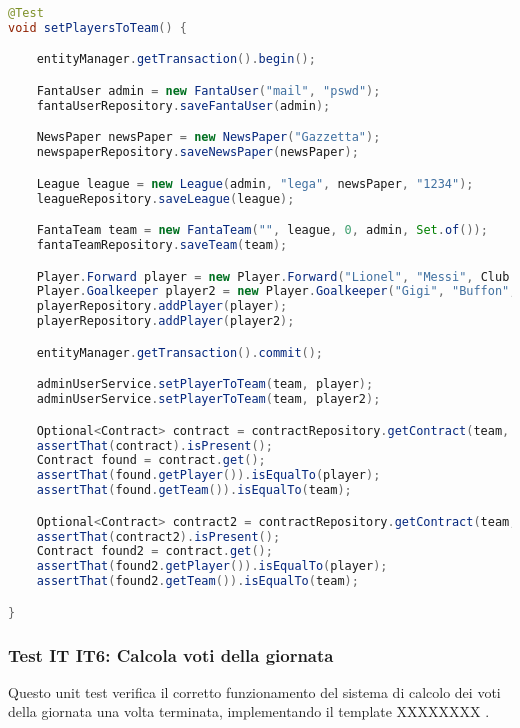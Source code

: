 \begin{lstlisting}[language=Java]
@Test
void setPlayersToTeam() {

	entityManager.getTransaction().begin();

    FantaUser admin = new FantaUser("mail", "pswd");
	fantaUserRepository.saveFantaUser(admin);

    NewsPaper newsPaper = new NewsPaper("Gazzetta");
	newspaperRepository.saveNewsPaper(newsPaper);

    League league = new League(admin, "lega", newsPaper, "1234");
	leagueRepository.saveLeague(league);

	FantaTeam team = new FantaTeam("", league, 0, admin, Set.of());
	fantaTeamRepository.saveTeam(team);

	Player.Forward player = new Player.Forward("Lionel", "Messi", Club.CREMONESE);
	Player.Goalkeeper player2 = new Player.Goalkeeper("Gigi", "Buffon", Club.JUVENTUS);
	playerRepository.addPlayer(player);
	playerRepository.addPlayer(player2);

	entityManager.getTransaction().commit();

	adminUserService.setPlayerToTeam(team, player);
	adminUserService.setPlayerToTeam(team, player2);

	Optional<Contract> contract = contractRepository.getContract(team, player);
	assertThat(contract).isPresent();
	Contract found = contract.get();
	assertThat(found.getPlayer()).isEqualTo(player);
	assertThat(found.getTeam()).isEqualTo(team);

    Optional<Contract> contract2 = contractRepository.getContract(team, player);
	assertThat(contract2).isPresent();
	Contract found2 = contract.get();
	assertThat(found2.getPlayer()).isEqualTo(player);
	assertThat(found2.getTeam()).isEqualTo(team);

}
\end{lstlisting}


\subsubsection{Test IT IT6: Calcola voti della giornata} \label{IT6}

Questo unit test verifica il corretto funzionamento del sistema di calcolo dei voti della giornata una volta terminata,
implementando il template XXXXXXXX .


